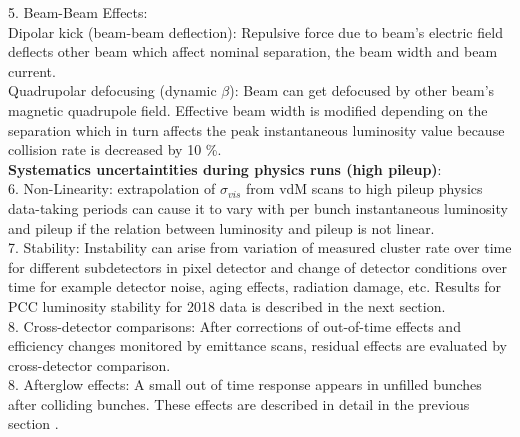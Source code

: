 5. Beam-Beam Effects: \\

Dipolar kick (beam-beam deflection): Repulsive force due to beam's electric field deflects other beam which affect nominal separation, the beam width and beam current. \\
Quadrupolar defocusing (dynamic $\beta$): Beam can get defocused by other beam's magnetic quadrupole field. Effective beam width is modified depending on the separation which in turn affects the peak instantaneous luminosity value because collision rate is decreased by 10 \%. \\

\newpage
\textbf{Systematics uncertaintities during physics runs (high pileup)}:\\

6. Non-Linearity: extrapolation of $\sigma_{vis}$ from vdM scans to high pileup physics data-taking periods can cause it to vary with per bunch instantaneous luminosity and pileup if the relation between luminosity and pileup is not linear.                               \\

7. Stability: Instability can arise from variation of measured cluster rate over time for different subdetectors in pixel detector and change of detector conditions over time for example detector noise, aging effects, radiation damage, etc. Results for PCC luminosity stability for 2018 data is described in the next section.                               \\

8. Cross-detector comparisons: After corrections of out-of-time effects and efficiency changes monitored by emittance scans, residual effects are evaluated by cross-detector comparison.                    \\

8. Afterglow effects: A small out of time response appears in unfilled bunches after colliding bunches. These effects are described in detail in the previous section \cite{CMS-PAS-LUM-18-002}. 



